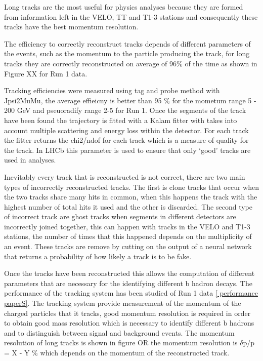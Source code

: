 Long tracks are the most useful for physics analyses because they are formed from information left in the VELO, TT and T1-3 stations and consequently these tracks have the best momentum resolution.

The efficiency to correctly reconstruct tracks depends of different parameters of the events, such as the momentum to the particle producing the track, for long tracks they are correctly reconstructed on average of 96$\%$ of the time as shown in Figure XX for Run 1 data. 

Tracking efficiencies were measured using tag and probe method with Jpsi2MuMu, the average effieicny is better than 95 $\%$ for the mometum range 5 - 200 GeV and pseuoradify range 2-5 for Run 1. %
Once the segments of the track have been found the trajectory is fitted with a Kalam fitter with takes into account multiple scattering and energy loss within the detector. For each track the fitter returns the chi2/ndof for each track which is a measure of quality for the track. In LHCb this parameter is used to ensure that only ‘good’ tracks are used in analyses. 

Inevitably every track that is reconstructed is not correct, there are two main types of incorrectly reconstructed tracks. The first is clone tracks that occur when the two tracks share many hits in common, when this happens the track with the highest number of total hits it used and the other is discarded. The second type of incorrect track are ghost tracks when segments in different detectors are incorrectly joined together, this can happen with tracks in the VELO and T1-3 stations, the number of times that this happened depends on the multiplicity of an event. These tracks are remove by cutting on the output of a neural network that returns a probability of how likely a track is to be fake.



Once the tracks have been reconstructed this allows the computation of different parameters that are necessary for the identifying different b hadron decays. The performance of the tracking system has been studied of Run 1 data \ref{ performance paperS}. The tracking system provide measurement of the momentum of the charged particles that it tracks, good momentum resolution is required in order to obtain good mass resolution which is necessary to identify different  b hadrons and to distinguish between signal and background events. The momentum resolution of long tracks is shown in figure  OR the momentum resolution is $\delta$p/p = X - Y $\%$ which depends on the momentum of the reconstructed track. 



